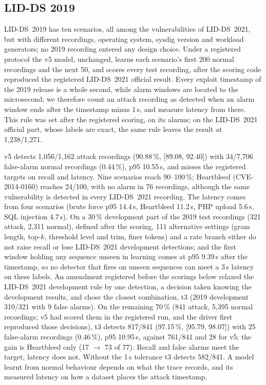 \subsection{LID-DS 2019}\label{sec:eval-2019}
LID-DS~2019 has ten scenarios, all among the vulnerabilities of LID-DS~2021, but with different recordings, operating
system, sysdig version and workload generators; no 2019 recording entered any design choice. Under a registered
protocol the v5 model, unchanged, learns each scenario's first 200 normal recordings and the next 50, and scores
every test recording, after the scoring code reproduced the registered LID-DS~2021 official result. Every
exploit timestamp of the 2019 release is a whole second, while alarm windows are located to the microsecond; we
therefore count an attack recording as detected when an alarm window ends after the timestamp minus 1\,s, and measure
latency from there. This rule was set after the registered scoring, on its alarms; on the LID-DS~2021 official part, whose labels
are exact, the same rule leaves the result at 1{,}238/1{,}271.

v5 detects 1{,}056/1{,}162 attack recordings (90.88\,\%, [89.08, 92.40]) with 34/7{,}706 false-alarm normal
recordings (0.44\,\%), p95 10.55\,s, and misses the registered targets on recall and latency. Nine scenarios reach
90--100\,\%; Heartbleed (CVE-2014-0160) reaches 24/100, with no alarm in 76 recordings, although the same vulnerability
is detected in every LID-DS~2021 recording. The latency comes from four scenarios (brute force p95 14.4\,s, Heartbleed
11.2\,s, PHP upload 5.6\,s, SQL injection 4.7\,s). On a 30\,\% development part of the 2019 test recordings (321 attack, 2{,}311 normal), defined
after the scoring, 111 alternative settings (gram length, top-$k$, threshold level and trim, finer tokens) and a rate
branch either do not raise recall or lose LID-DS~2021 development detections; and the first window holding any
sequence unseen in learning comes at p95 9.39\,s after the timestamp, so no detector that fires on unseen sequences can
meet a 3\,s latency on these labels. An amendment registered before the scorings below relaxed the LID-DS~2021
development rule by one detection, a decision taken knowing the development results, and chose the closest combination,
t3 (2019 development 310/321 with 9 false alarms). On the remaining 70\,\% (841 attack, 5{,}395 normal recordings; v5
had scored them in the registered run, and the driver first reproduced those decisions), t3 detects 817/841
(97.15\,\%, [95.79, 98.07]) with 25 false-alarm recordings (0.46\,\%), p95 10.95\,s, against 761/841 and 28 for v5;
the gain is Heartbleed only (17 $\to$ 73 of 77). Recall and false alarms meet the target, latency does not. Without the
1\,s tolerance t3 detects 582/841. A model learnt from normal behaviour depends on what the trace records, and its measured
latency on how a dataset places the attack timestamp.
